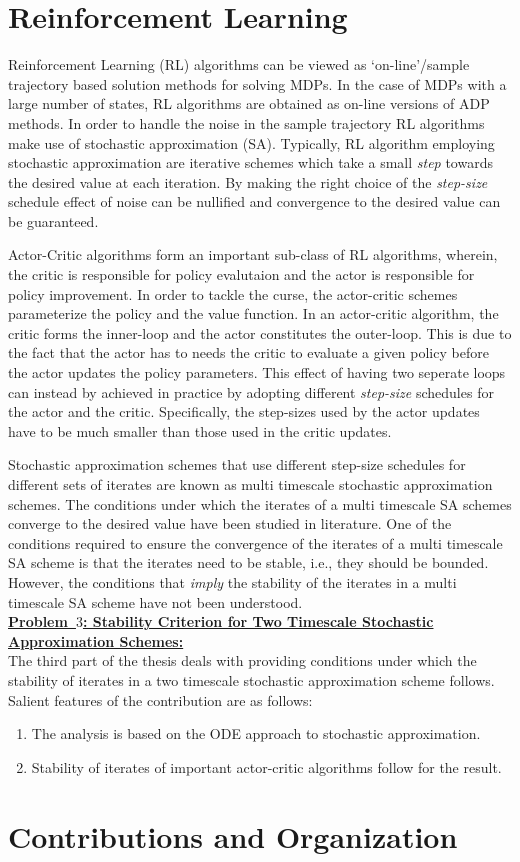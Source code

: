 \section{Reinforcement Learning}
Reinforcement Learning (RL) algorithms can be viewed as `on-line'/sample trajectory based solution methods for solving MDPs. In the case of MDPs with a large number of states, RL algorithms are obtained as on-line versions of ADP methods. In order to handle the noise in the sample trajectory RL algorithms make use of stochastic approximation (SA). Typically, RL algorithm employing stochastic approximation are iterative schemes which take a small \emph{step} towards the desired value at each iteration. By making the right choice of the \emph{step-size} schedule effect of noise can be nullified and convergence to the desired value can be guaranteed.\par
Actor-Critic algorithms form an important sub-class of RL algorithms, wherein, the critic is responsible for policy evalutaion and the actor is responsible for policy improvement. In order to tackle the curse, the actor-critic schemes parameterize the policy and the value function. In an actor-critic algorithm, the critic forms the inner-loop and the actor constitutes the outer-loop. This is due to the fact that the actor has to needs the critic to evaluate a given policy before the actor updates the policy parameters. This effect of having two seperate loops can instead by achieved in practice by adopting different \emph{step-size} schedules for the actor and the critic. Specifically, the step-sizes used by the actor updates have to be much smaller than those used in the critic updates.\par
Stochastic approximation schemes that use different step-size schedules for different sets of iterates are known as multi timescale stochastic approximation schemes. The conditions under which the iterates of a multi timescale SA schemes converge to the desired value have been studied in literature. One of the conditions required to ensure the convergence of the iterates of a multi timescale SA scheme is that the iterates need to be stable, i.e., they should be bounded. However, the conditions that \emph{imply} the stability of the iterates in a multi timescale SA scheme have not been understood.\\
\textbf{\underline{Problem~$3$: Stability Criterion for Two Timescale Stochastic Approximation Schemes:}}\\
The third part of the thesis deals with providing conditions under which the stability of iterates in a two timescale stochastic approximation scheme follows. Salient features of the contribution are as follows:
\begin{enumerate}
\item The analysis is based on the ODE approach to stochastic approximation.
\item Stability of iterates of important actor-critic algorithms follow for the result.
\end{enumerate}
\section{Contributions and Organization}
